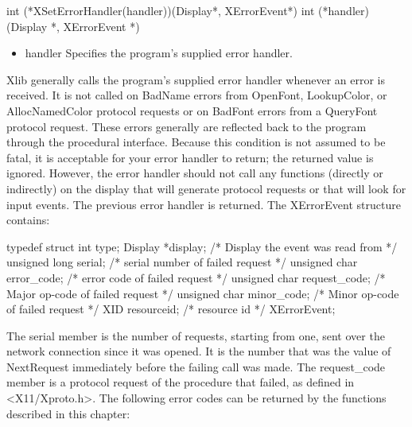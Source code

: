 \documentclass{report}
\begin{document}
\begin{itemize}
            \bigbreak \noindent 
            \begin{cppcode}
                int (*XSetErrorHandler(handler))(Display*, XErrorEvent*)
                    int (*handler)(Display *, XErrorEvent *)
            \end{cppcode}
            \begin{itemize}
                \item handler Specifies the program’s supplied error handler.
            \end{itemize}
            \bigbreak \noindent 
            Xlib generally calls the program’s supplied error handler whenever an error is received. It is not called on BadName errors from OpenFont, LookupColor, or AllocNamedColor protocol requests or on BadFont errors from a QueryFont protocol request. These errors generally are reflected back to the program through the procedural interface. Because this condition is not assumed to be fatal, it is acceptable for your error handler to return; the returned value is ignored. However, the error handler should not call any functions (directly or indirectly) on the display that will generate protocol requests or that will look for input events. The previous error handler is returned.
            \bigbreak \noindent 
            The XErrorEvent structure contains:
            \bigbreak \noindent 
            \begin{cppcode}
                typedef struct {
                    int type;
                    Display *display;                   /* Display the event was read from */
                    unsigned long serial;               /* serial number of failed request */
                    unsigned char error_code;           /* error code of failed request */
                    unsigned char request_code;         /* Major op-code of failed request */
                    unsigned char minor_code;           /* Minor op-code of failed request */
                    XID resourceid;                     /* resource id */
                } XErrorEvent;
            \end{cppcode}
            \bigbreak \noindent 
            The serial member is the number of requests, starting from one, sent over the network connection since it was opened. It is the number that was the value of NextRequest immediately before the failing call was made. The request\_code member is a protocol request of the procedure that failed, as defined in <X11/Xproto.h>. The following error codes can be returned by the functions described in this chapter:

\end{itemize}
\end{document}

